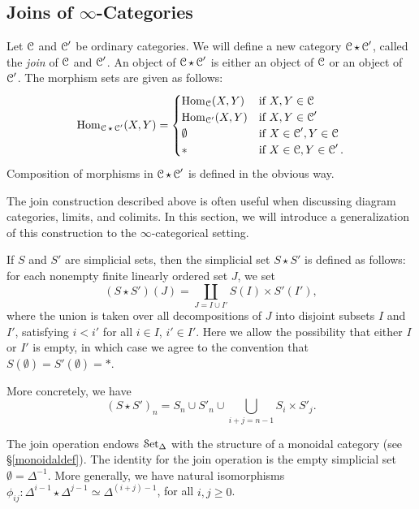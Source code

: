 \subsection{Joins of $\infty$-Categories}\label{join}
\begin{1.2.8 Joins of inf-cats}
Let $\operatorname{\mathcal{C}}$ and $\operatorname{\mathcal{C}}'$ be ordinary categories. We will define a
new category $\operatorname{\mathcal{C}} \star \operatorname{\mathcal{C}}'$, called the {\it join} of $\operatorname{\mathcal{C}}$ and
$\operatorname{\mathcal{C}}'$. An object of $\operatorname{\mathcal{C}} \star \operatorname{\mathcal{C}}'$ is either an object of
$\operatorname{\mathcal{C}}$ or an object of $\operatorname{\mathcal{C}}'$. The morphism sets are given as follows:
 $$\operatorname{Hom}_{\operatorname{\mathcal{C}} \star \operatorname{\mathcal{C}}'}(X,Y) = \begin{cases} \operatorname{Hom}_{\operatorname{\mathcal{C}}}(X,Y) & \text{if } X,Y \in \operatorname{\mathcal{C}} \\
\operatorname{Hom}_{\operatorname{\mathcal{C}}'}(X,Y) & \text{if } X,Y \in \operatorname{\mathcal{C}}' \\
\emptyset & \text{if } X \in \operatorname{\mathcal{C}}', Y \in \operatorname{\mathcal{C}} \\
\ast & \text{if } X \in \operatorname{\mathcal{C}}, Y \in \operatorname{\mathcal{C}}'. \end{cases}$$
Composition of morphisms in $\operatorname{\mathcal{C}} \star \operatorname{\mathcal{C}}'$ is defined in the
obvious way. 

The join construction described above is often useful when discussing diagram categories, limits, and colimits. In this section, we will introduce a generalization of this construction to the $\infty$-categorical setting.

\begin{definition}
If $S$ and $S'$ are
simplicial sets, then the simplicial set $S \star S'$ is defined as
follows: for each nonempty finite linearly ordered set $J$, we set
$$(S \star S')(J) = \coprod_{J = I \cup I'} S(I) \times
S'(I'),$$ where the union is taken over all decompositions of $J$ into disjoint subsets $I$ and $I'$, satisfying $i < i'$ for all $i \in I$, $i' \in I'$. Here we allow the
possibility that either $I$ or $I'$ is empty, in which case we agree to
the convention that $S(\emptyset) = S'(\emptyset) = \ast$.
\end{definition}

More concretely, we have $$(S \star S')_{n} =
S_n \cup S'_n \cup \bigcup_{i+j = n-1} S_i \times S'_j.$$

The join operation endows $\operatorname{\mathcal{S}et_{\Delta}}$ with the
structure of a monoidal category (see \S \ref{monoidaldef}).
The identity for the join operation is
the empty simplicial set $\emptyset = \Delta^{-1}$. More generally, we have
natural isomorphisms $\phi_{ij}: \Delta^{i-1} \star \Delta^{j-1} \simeq
\Delta^{(i+j)-1}$, for all $i, j \geq 0$.


\end{1.2.8 Joins of inf-cats}
